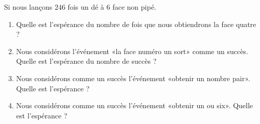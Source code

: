 
\begin{exercice}\label{exoPremiere-0076}

    Si nous lançons \( 246\) fois un dé à \( 6\) face non pipé.
    \begin{enumerate}
        \item
            Quelle est l'espérance du nombre de fois que nous obtiendrons la face quatre ?
        \item
            Nous considérons l'événement «la face numéro un sort» comme un succès. Quelle est l'espérance du nombre de succès ?
        \item
            Nous considérons comme un succès l'événement «obtenir un nombre pair». Quelle est l'espérance ?
        \item
            Nous considérons comme un succès l'événement «obtenir un ou six». Quelle est l'espérance ?
    \end{enumerate}
\end{exercice}
